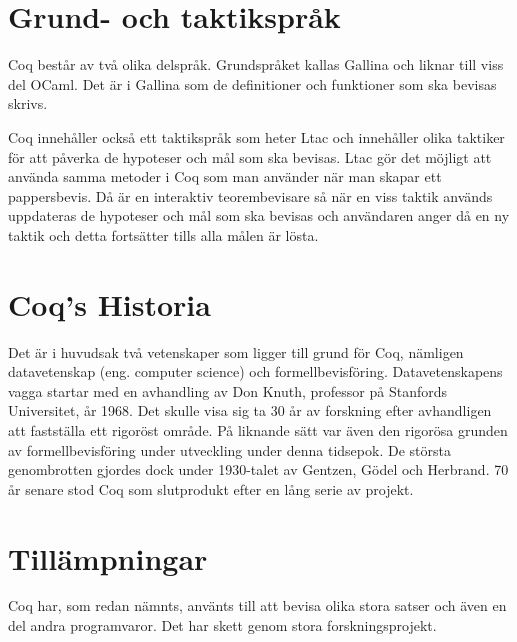 
\section{Grund- och taktikspråk}
Coq består av två olika delspråk. Grundspråket kallas Gallina och liknar till
viss del OCaml. Det är i Gallina som de definitioner och funktioner som ska
bevisas skrivs.

Coq innehåller också ett taktikspråk som heter Ltac och innehåller olika
taktiker för att påverka de hypoteser och mål som ska bevisas. Ltac gör det
möjligt att använda samma metoder i Coq som man använder när man skapar ett
pappersbevis. Då \coq är en interaktiv teorembevisare så när en viss taktik
används uppdateras de hypoteser och mål som ska bevisas och användaren
anger då en ny taktik och detta fortsätter tills alla målen är lösta.

\section{Coq's Historia}
Det är i huvudsak två vetenskaper som ligger till grund för Coq, nämligen
datavetenskap (eng. computer science) och formellbevisföring. Datavetenskapens
vagga startar med en avhandling av Don Knuth, professor på Stanfords
Universitet, år 1968. Det skulle visa sig ta 30 år av forskning efter
avhandligen att fastställa ett rigoröst område. På liknande sätt var även den
rigorösa grunden av formellbevisföring under utveckling under denna tidsepok.
De största genombrotten gjordes dock under 1930-talet av Gentzen, Gödel och
Herbrand. 70 år senare stod Coq som slutprodukt efter en lång serie av projekt.

\section{Tillämpningar}
Coq har, som redan nämnts, använts till att bevisa olika stora satser och även
en del andra programvaror. Det har skett genom stora forskningsprojekt.

